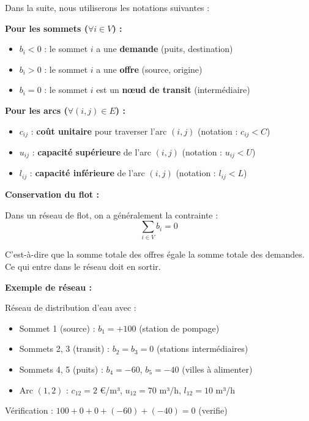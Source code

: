 \documentclass[12pt,a4paper]{article}
\begin{document}
\begin{definition}
Dans la suite, nous utiliserons les notations suivantes :

\textbf{Pour les sommets ($\forall i \in V$) :}
\begin{itemize}
    \item $b_i < 0$ : le sommet $i$ a une \textcolor{importantrouge}{\textbf{demande}} (puits, destination)
    \item $b_i > 0$ : le sommet $i$ a une \textcolor{defvert}{\textbf{offre}} (source, origine)
    \item $b_i = 0$ : le sommet $i$ est un \textcolor{titrebleu}{\textbf{nœud de transit}} (intermédiaire)
\end{itemize}

\textbf{Pour les arcs ($\forall (i,j) \in E$) :}
\begin{itemize}
    \item $c_{ij}$ : \textcolor{algoviolet}{\textbf{coût unitaire}} pour traverser l'arc $(i,j)$ (notation : $c_{ij} < C$)
    \item $u_{ij}$ : \textcolor{exempleorange}{\textbf{capacité supérieure}} de l'arc $(i,j)$ (notation : $u_{ij} < U$)
    \item $l_{ij}$ : \textcolor{defvert}{\textbf{capacité inférieure}} de l'arc $(i,j)$ (notation : $l_{ij} < L$)
\end{itemize}
\end{definition}

\begin{notecours}
\textbf{Conservation du flot :}

Dans un réseau de flot, on a généralement la contrainte :
$$\sum_{i \in V} b_i = 0$$

C'est-à-dire que la somme totale des offres égale la somme totale des demandes. Ce qui entre dans le réseau doit en sortir.
\end{notecours}

\begin{exemple}
\textbf{Exemple de réseau :}

Réseau de distribution d'eau avec :
\begin{itemize}
    \item Sommet 1 (source) : $b_1 = +100$ (station de pompage)
    \item Sommets 2, 3 (transit) : $b_2 = b_3 = 0$ (stations intermédiaires)
    \item Sommets 4, 5 (puits) : $b_4 = -60$, $b_5 = -40$ (villes à alimenter)
    \item Arc $(1,2)$ : $c_{12} = 2$ €/m³, $u_{12} = 70$ m³/h, $l_{12} = 10$ m³/h
\end{itemize}

Vérification : $100 + 0 + 0 + (-60) + (-40) = 0$ (verifie)
\end{exemple}
\end{document}
